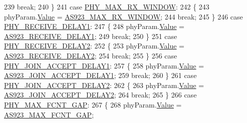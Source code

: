 \begin{DoxyCode}
239             \textcolor{keywordflow}{break};
240         \}
241         \textcolor{keywordflow}{case} \mbox{\hyperlink{group___r_e_g_i_o_n_gga51cbe8f5433d914fe9cf81b451de2c2dacf2bd6f434ce2844651513ad2b9b9da5}{PHY\_MAX\_RX\_WINDOW}}:
242         \{
243             phyParam.\mbox{\hyperlink{unionu_phy_param_a8e0dcce3428a8051614e852b8836d0d1}{Value}} = \mbox{\hyperlink{group___r_e_g_i_o_n_a_s923_ga1da68477a3fef68cc666a41fb5362bc6}{AS923\_MAX\_RX\_WINDOW}};
244             \textcolor{keywordflow}{break};
245         \}
246         \textcolor{keywordflow}{case} \mbox{\hyperlink{group___r_e_g_i_o_n_gga51cbe8f5433d914fe9cf81b451de2c2da3680d45f45e3e0a96ce9f1e1b5ed7371}{PHY\_RECEIVE\_DELAY1}}:
247         \{
248             phyParam.\mbox{\hyperlink{unionu_phy_param_a8e0dcce3428a8051614e852b8836d0d1}{Value}} = \mbox{\hyperlink{group___r_e_g_i_o_n_a_s923_gaa18d3ea411b8511078af8c0a07304999}{AS923\_RECEIVE\_DELAY1}};
249             \textcolor{keywordflow}{break};
250         \}
251         \textcolor{keywordflow}{case} \mbox{\hyperlink{group___r_e_g_i_o_n_gga51cbe8f5433d914fe9cf81b451de2c2da9c7e3df5f55fab406960a9e5bf635155}{PHY\_RECEIVE\_DELAY2}}:
252         \{
253             phyParam.\mbox{\hyperlink{unionu_phy_param_a8e0dcce3428a8051614e852b8836d0d1}{Value}} = \mbox{\hyperlink{group___r_e_g_i_o_n_a_s923_ga37f081e957cc36c733b5008aa46b9511}{AS923\_RECEIVE\_DELAY2}};
254             \textcolor{keywordflow}{break};
255         \}
256         \textcolor{keywordflow}{case} \mbox{\hyperlink{group___r_e_g_i_o_n_gga51cbe8f5433d914fe9cf81b451de2c2daf564c82ebd72dcd6c4fc1e702b2ec64c}{PHY\_JOIN\_ACCEPT\_DELAY1}}:
257         \{
258             phyParam.\mbox{\hyperlink{unionu_phy_param_a8e0dcce3428a8051614e852b8836d0d1}{Value}} = \mbox{\hyperlink{group___r_e_g_i_o_n_a_s923_gaa108eaacc8ee4c9a46b37327b3b2eea1}{AS923\_JOIN\_ACCEPT\_DELAY1}};
259             \textcolor{keywordflow}{break};
260         \}
261         \textcolor{keywordflow}{case} \mbox{\hyperlink{group___r_e_g_i_o_n_gga51cbe8f5433d914fe9cf81b451de2c2da04e6c3d25ce44a74c0a29f28aa92eb48}{PHY\_JOIN\_ACCEPT\_DELAY2}}:
262         \{
263             phyParam.\mbox{\hyperlink{unionu_phy_param_a8e0dcce3428a8051614e852b8836d0d1}{Value}} = \mbox{\hyperlink{group___r_e_g_i_o_n_a_s923_gafd48180d34e9cb94a0747ea0a2dfff28}{AS923\_JOIN\_ACCEPT\_DELAY2}};
264             \textcolor{keywordflow}{break};
265         \}
266         \textcolor{keywordflow}{case} \mbox{\hyperlink{group___r_e_g_i_o_n_gga51cbe8f5433d914fe9cf81b451de2c2da01c12b14686172b4a3c4d095deef4248}{PHY\_MAX\_FCNT\_GAP}}:
267         \{
268             phyParam.\mbox{\hyperlink{unionu_phy_param_a8e0dcce3428a8051614e852b8836d0d1}{Value}} = \mbox{\hyperlink{group___r_e_g_i_o_n_a_s923_ga996b3bad607207a4c54e5a2b253e5dfd}{AS923\_MAX\_FCNT\_GAP}};

\end{DoxyCode}
